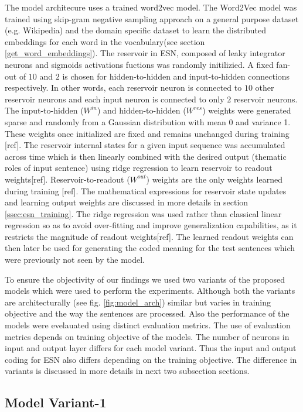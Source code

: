The model architecure uses a trained word2vec model. The Word2Vec model was trained using skip-gram negative sampling approach on a general purpose dataset (e.g. Wikipedia) and the domain specific dataset to learn the distributed embeddings for each word in the vocabulary(see section \ref{get_word_embeddings}). The reservoir in ESN, composed of leaky integrator neurons and sigmoids activations fuctions was randomly initilizied. A fixed fan-out of $10$ and $2$ is chosen for hidden-to-hidden and input-to-hidden connections respectively. In other words, each reservoir neuron is connected to $10$ other reservoir neurons and each input neuron is connected to only $2$ reservoir neurons. The input-to-hidden ($W^{in}$) and hidden-to-hidden ($W^{res}$) weights were generated sparse and randomly from a Gaussian distribution with mean 0 and variance 1. These weights once initialized are fixed and remains unchanged during training [ref]. The reservoir internal states for a given input sequence was accumulated across time which is then linearly combined with the desired output (thematic roles of input sentence) using ridge regression to learn reservoir to readout weights[ref]. Reservoir-to-readout ($W^{out}$) weights are the only weights learned during training [ref]. The mathematical expressions for reservoir state updates and learning output weights are discussed in more details in section \ref{ssec:esn_training}. The ridge regression was used rather than classical linear regression so as to avoid over-fitting and improve generalization capabilities, as it restricts the magnitude of readout weights[ref]. The learned readout weights can then later be used for generating the coded meaning for the test sentences which were previously not seen by the model.

To ensure the objectivity of our findings we used two variants of the proposed models which were used to perform the experiments. Although both the variants are architecturally (see fig. \ref{fig:model_arch}) similar but varies in training objective and the way the sentences are processed. Also the performance of the models were evelauated using distinct evaluation metrics. The use of evaluation metrics depends on training objective of the models. The number of neurons in input and output layer differs for each model variant. Thus the input and output coding for ESN also differs depending on the training objective. The difference in variants is discussed in more details in next two subsection sections.

\subsection{Model Variant-1}

